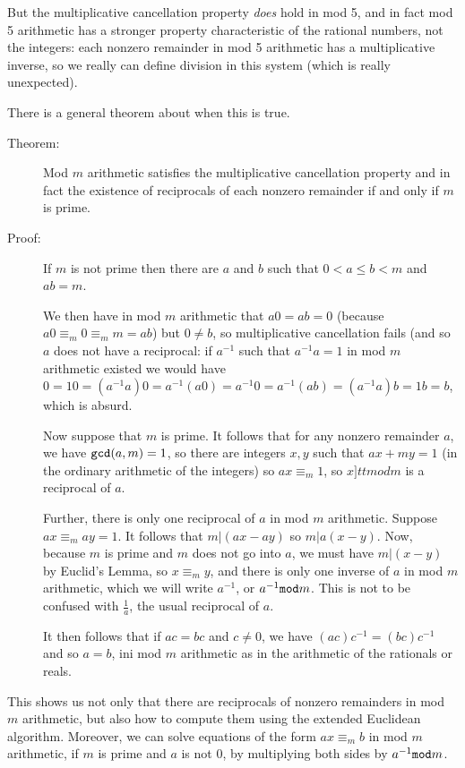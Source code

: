 \documentclass[12pt]{article}
\begin{document}
But the multiplicative cancellation property {\em does\/} hold in mod 5, and in fact mod 5 arithmetic has a stronger property characteristic of the rational numbers, not the integers:  each  nonzero remainder in mod 5 arithmetic has a multiplicative inverse, so we really can define division in this system (which is really unexpected).

There is a general theorem about when this is true.

\begin{description}
\item[Theorem:]  Mod $m$ arithmetic satisfies the multiplicative cancellation property and in fact the existence of reciprocals of each nonzero remainder if and only if $m$ is prime.

\item[Proof:]  If $m$ is not prime then there are $a$ and $b$ such that $0 <a \leq b <m$ and $ab=m$.

We then have in mod $m$ arithmetic that $a0 = ab = 0$ (because $a0 \equiv_m 0 \equiv_m m = ab$) but $0 \neq b$, so multiplicative cancellation fails (and so $a$ does not have a reciprocal:  if $a^{-1}$ such that $a^{-1}a =1$ in mod $m$ arithmetic existed we would have 
$0 = 10 = (a^{-1}a)0 = a^{-1}(a0) = a^{-1}0 = a^{-1}(ab) = (a^{-1}a)b = 1b = b$, which is absurd.

Now suppose that $m$ is prime.  It follows that for any nonzero remainder $a$, we have ${\tt gcd}(a,m)=1$, so there are integers $x,y$ such that $ax+my=1$ (in the ordinary arithmetic of the integers) so $ax \equiv_m 1$, so $x {]tt mod} m$ is a reciprocal of $a$.

Further, there is only one reciprocal of $a$ in mod $m$ arithmetic.  Suppose $ax \equiv_m  ay = 1$.  It follows that $m|(ax-ay)$ so $m|a(x-y)$.  Now, because $m$ is prime and $m$ does not go into $a$, we must have $m|(x-y)$ by Euclid's Lemma, so $x \equiv_m y$, and there is only one inverse of $a$ in mod $m$ arithmetic, which we will write $a^{-1}$, or $a^{-1}{\tt mod} m$.  This is not to be confused with $\frac 1a$, the usual reciprocal of $a$.

It then follows that if $ac=bc$ and $c \neq 0$, we have $(ac)c^{-1} = (bc)c^{-1}$ and so $a=b$, ini mod $m$ arithmetic as in the arithmetic of the rationals or reals.

\end{description}

This shows us not only that there are reciprocals of nonzero remainders in mod $m$ arithmetic, but also how to compute them using the extended Euclidean algorithm.  Moreover, we can solve equations of the form $ax \equiv_m b$ in mod $m$ arithmetic, if $m$ is prime and $a$ is not 0, by multiplying both sides by $a^{-1}{\tt mod} m$.
\end{document}
